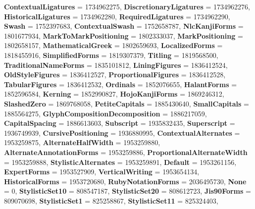 \begin{DoxyCompactItemize}
\newline
{\bfseries Contextual\+Ligatures} = 1734962275, 
{\bfseries Discretionary\+Ligatures} = 1734962276, 
{\bfseries Historical\+Ligatures} = 1734962280, 
{\bfseries Required\+Ligatures} = 1734962290, 
\newline
{\bfseries Swash} = 1752397683, 
{\bfseries Contextual\+Swash} = 1752658787, 
{\bfseries Nlc\+Kanji\+Forms} = 1801677934, 
{\bfseries Mark\+To\+Mark\+Positioning} = 1802333037, 
\newline
{\bfseries Mark\+Positioning} = 1802658157, 
{\bfseries Mathematical\+Greek} = 1802659693, 
{\bfseries Localized\+Forms} = 1818455916, 
{\bfseries Simplified\+Forms} = 1819307379, 
\newline
{\bfseries Titling} = 1819568500, 
{\bfseries Traditional\+Name\+Forms} = 1835101812, 
{\bfseries Lining\+Figures} = 1836412524, 
{\bfseries Old\+Style\+Figures} = 1836412527, 
\newline
{\bfseries Proportional\+Figures} = 1836412528, 
{\bfseries Tabular\+Figures} = 1836412532, 
{\bfseries Ordinals} = 1852076655, 
{\bfseries Halant\+Forms} = 1852596584, 
\newline
{\bfseries Kerning} = 1852990827, 
{\bfseries Hojo\+Kanji\+Forms} = 1869246312, 
{\bfseries Slashed\+Zero} = 1869768058, 
{\bfseries Petite\+Capitals} = 1885430640, 
\newline
{\bfseries Small\+Capitals} = 1885564275, 
{\bfseries Glyph\+Composition\+Decomposition} = 1886217059, 
{\bfseries Capital\+Spacing} = 1886613603, 
{\bfseries Subscript} = 1935832435, 
\newline
{\bfseries Superscript} = 1936749939, 
{\bfseries Cursive\+Positioning} = 1936880995, 
{\bfseries Contextual\+Alternates} = 1953259875, 
{\bfseries Alternate\+Half\+Width} = 1953259880, 
\newline
{\bfseries Alternate\+Annotation\+Forms} = 1953259886, 
{\bfseries Proportional\+Alternate\+Width} = 1953259888, 
{\bfseries Stylistic\+Alternates} = 1953259891, 
{\bfseries Default} = 1953261156, 
\newline
{\bfseries Expert\+Forms} = 1953527909, 
{\bfseries Vertical\+Writing} = 1953654134, 
{\bfseries Historical\+Forms} = 1953720680, 
{\bfseries Ruby\+Notation\+Forms} = 2036495730, 
\newline
{\bfseries None} = 0, 
{\bfseries Stylistic\+Set10} = 808547187, 
{\bfseries Stylistic\+Set20} = 808612723, 
{\bfseries Jis90\+Forms} = 809070698, 
\newline
{\bfseries Stylistic\+Set1} = 825258867, 
{\bfseries Stylistic\+Set11} = 825324403, 

\end{DoxyCompactItemize}
